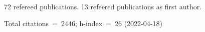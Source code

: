 72 refereed publications. 13 refeered publications as first author.

Total citations~=~2446; h-index~=~26 (2022-04-18)